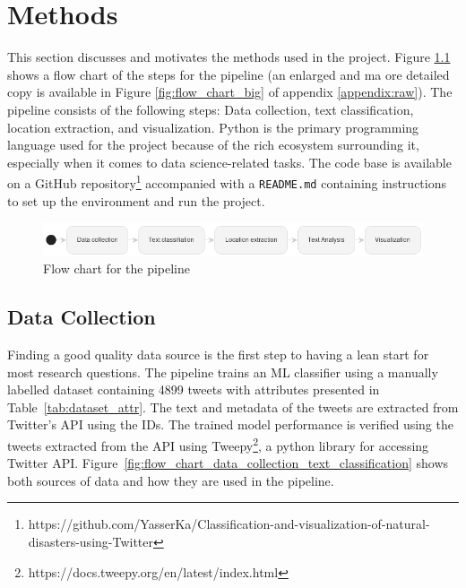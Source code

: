 \chapter{Methods}

This section discusses and motivates the methods used in the project. Figure \ref{fig:flow_chart}
shows a flow chart of the steps for the pipeline (an enlarged and ma ore detailed copy is available in
Figure \ref{fig:flow_chart_big} of appendix \ref{appendix:raw}). The pipeline consists of the
following steps: Data collection, text classification, location extraction, and visualization.
Python is the primary programming language used for the project because of the rich ecosystem
surrounding it, especially when it comes to data science-related tasks. The code base is available
on a GitHub
repository\footnote{https://github.com/YasserKa/Classification-and-visualization-of-natural-disasters-using-Twitter}
accompanied with a \texttt{README.md} containing instructions to set up the environment and run the
project.

\begin{figure}[H]
\begin{center}
  \includegraphics[width=\columnwidth]{./images/pipeline_concise.png}
\end{center}
\caption{Flow chart for the pipeline}
\label{fig:flow_chart}
\end{figure}

\section{Data Collection}

Finding a good quality data source is the first step to having a lean start for most research
questions. The pipeline trains an \ac{ML} classifier using a manually labelled dataset containing
4899 tweets with attributes presented in Table~\ref{tab:dataset_attr}. The text and metadata of the tweets are extracted
from Twitter's API using the IDs. The trained model performance is verified using the tweets
extracted from the API using Tweepy\footnote{https://docs.tweepy.org/en/latest/index.html}, a python
library for accessing Twitter API. Figure~\ref{fig:flow_chart_data_collection_text_classification}
shows both sources of data and how they are used in the pipeline.

